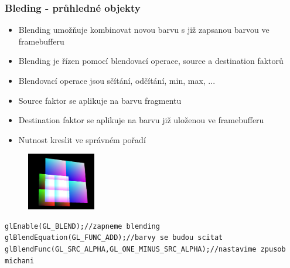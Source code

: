 \begin{frame}[fragile]
\frametitle{Bleding - průhledné objekty}
  \begin{itemize}
  \item Blending umožňuje kombinovat novou barvu s již zapsanou barvou ve framebufferu
  \item Blending je řízen pomocí blendovací operace, source a destination faktorů
  \item Blendovací operace jsou sčítání, odčítání, min, max, ...
  \item Source faktor se aplikuje na barvu fragmentu
  \item Destination faktor se aplikuje na barvu již uloženou ve framebufferu
  \item Nutnost kreslit ve správném pořadí
  \end{itemize}
  \begin{figure}[h]
  \includegraphics[width=3cm,keepaspectratio]{pics/blending.jpg}
  \end{figure}
  {\scriptsize
  \begin{verbatim}
glEnable(GL_BLEND);//zapneme blending
glBlendEquation(GL_FUNC_ADD);//barvy se budou scitat
glBlendFunc(GL_SRC_ALPHA,GL_ONE_MINUS_SRC_ALPHA);//nastavime zpusob michani
  \end{verbatim}
  }
\end{frame}


